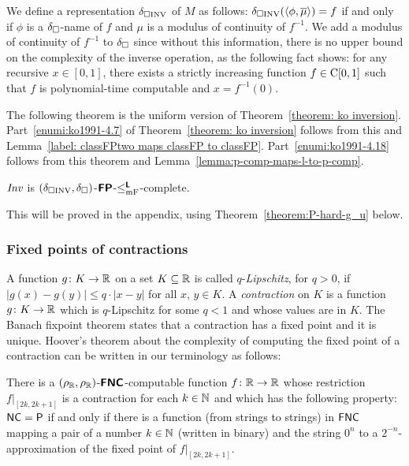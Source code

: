 \documentclass[envcountsame,orivec,oribibl]{llncs}
\begin{document}
We define a representation $\delta _{\square \mathrm{INV}}$ of $M$ as follows:
$\delta _{\square \mathrm{INV}}(\langle \phi, \overline{\mu} \rangle) = f$ 
if and only if $\phi$ is a $\delta _\square$-name of $f$ 
and $\mu$ is a modulus of continuity of $f^{-1}$.
We add a modulus of continuity of $f^{-1}$ to $\delta _\square$
since without this information, there is no upper bound on 
the complexity of the inverse operation, 
as the following fact \cite[Theorem 4.4]{ko1991complexity} shows: 
for any recursive $x \in [0, 1]$, 
there exists a strictly increasing function $f \in \mathrm C[0, 1]$ 
such that $f$ is polynomial-time computable and $x = f^{-1}(0)$.

The following theorem is the uniform version of Theorem~\ref{theorem: ko inversion}. 
Part~\ref{enumi:ko1991-4.7} of Theorem~\ref{theorem: ko inversion} 
follows from this and Lemma~\ref{label: classFPtwo maps classFP to classFP}.
Part~\ref{enumi:ko1991-4.18} follows from this theorem and Lemma~\ref{lemma:p-comp-maps-l-to-p-comp}.

\begin{theorem}
 \label{theorem:INV-is-P-complete}
 $\mathit{Inv}$ is $(\delta _{\square \mathrm{INV}}, \delta _\square)$-$\text{\bfseries \sffamily \upshape FP}$-$\leq _{\mathrm{mF}} ^{\text{\bfseries \sffamily \upshape L}}$-complete.
\end{theorem}

This will be proved in the appendix, 
using 
Theorem~\ref{theorem:P-hard-g_u} below. 

\subsubsection{Fixed points of contractions}

A function $g \colon K \to \mathbb R$ on a set $K \subseteq \mathbb R$
is called $q$-\emph{Lipschitz}, for $q > 0$, 
if $
\lvert g (x) - g (y) \rvert \leq q \cdot \lvert x - y \rvert
$ for all $x$, $y \in K$. 
A \emph{contraction} on $K$ is 
a function $g \colon K \to \mathbb R$ which is $q$-Lipschitz for some $q < 1$
and whose values are in $K$. 
The Banach fixpoint theorem states that 
a contraction has a fixed point and it is unique. 
Hoover's theorem about the complexity of computing the fixed point
of a contraction can be written in our terminology as follows:

\begin{theorem}
\label{theorem:hoover1991-4.5}
 There is a $(\rho _\mathbb R, \rho _\mathbb R)$-$\text{\bfseries \sffamily \upshape FNC}$-computable function $f \colon \mathbb R \to \mathbb R$
 whose restriction $f|_{[2k, 2k+1]}$ is a contraction for each $k \in \mathbb N$ and
 which has the following property: 
 $\mathsf{NC} = \mathsf{P}$ if and only if 
 there is a function (from strings to strings) in $\mathsf{FNC}$ mapping 
 a pair of a number $k \in \mathbb N$ (written in binary) and the string $0^n$
 to a $2^{-n}$-approximation of the 
 fixed point of $f |_{[2k, 2k + 1]}$. 
\end{theorem}
\end{document}

